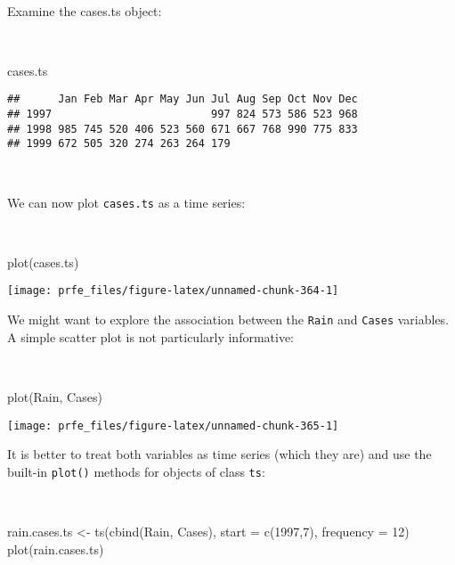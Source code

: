 \documentclass[
  12pt,
  a4paper]{book}
\newenvironment{Shaded}{\begin{snugshade}}{\end{snugshade}}
\newcommand{\AttributeTok}[1]{\textcolor[rgb]{0.77,0.63,0.00}{#1}}
\newcommand{\DecValTok}[1]{\textcolor[rgb]{0.00,0.00,0.81}{#1}}
\newcommand{\FunctionTok}[1]{\textcolor[rgb]{0.00,0.00,0.00}{#1}}
\newcommand{\NormalTok}[1]{#1}
\newcommand{\OtherTok}[1]{\textcolor[rgb]{0.56,0.35,0.01}{#1}}
\begin{document}
~

Examine the cases.ts object:

~

\begin{Shaded}
\begin{Highlighting}[]
\NormalTok{cases.ts}
\end{Highlighting}
\end{Shaded}

\begin{verbatim}
##      Jan Feb Mar Apr May Jun Jul Aug Sep Oct Nov Dec
## 1997                         997 824 573 586 523 968
## 1998 985 745 520 406 523 560 671 667 768 990 775 833
## 1999 672 505 320 274 263 264 179
\end{verbatim}

~

We can now plot \texttt{cases.ts} as a time series:

~

\begin{Shaded}
\begin{Highlighting}[]
\FunctionTok{plot}\NormalTok{(cases.ts)}
\end{Highlighting}
\end{Shaded}

\begin{center}\texttt{[image: prfe\_files/figure-latex/unnamed-chunk-364-1]} \end{center}

\newpage

We might want to explore the association between the \texttt{Rain} and \texttt{Cases} variables. A simple scatter plot is not particularly informative:

~

\begin{Shaded}
\begin{Highlighting}[]
\FunctionTok{plot}\NormalTok{(Rain, Cases)}
\end{Highlighting}
\end{Shaded}

\begin{center}\texttt{[image: prfe\_files/figure-latex/unnamed-chunk-365-1]} \end{center}

\newpage

It is better to treat both variables as time series (which they are) and use the built-in \texttt{plot()} methods for objects of class \texttt{ts}:

~

\begin{Shaded}
\begin{Highlighting}[]
\NormalTok{rain.cases.ts }\OtherTok{\textless{}{-}} \FunctionTok{ts}\NormalTok{(}\FunctionTok{cbind}\NormalTok{(Rain, Cases), }\AttributeTok{start =} \FunctionTok{c}\NormalTok{(}\DecValTok{1997}\NormalTok{,}\DecValTok{7}\NormalTok{), }\AttributeTok{frequency =} \DecValTok{12}\NormalTok{)}
\FunctionTok{plot}\NormalTok{(rain.cases.ts)}
\end{Highlighting}
\end{Shaded}
\end{document}
